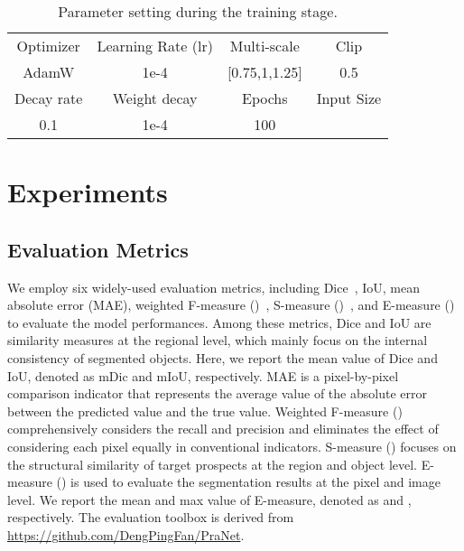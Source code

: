 \documentclass[journal]{IEEEtran}
\begin{document}
\begin{table}

\small
  \centering
  \caption{Parameter setting during the training stage.}
   \renewcommand{\arraystretch}{1.0}
   {
	\setlength\tabcolsep{6.0pt}
    \begin{tabular}{cccc}
    \hline
    Optimizer & Learning Rate (lr) & Multi-scale & Clip\\
AdamW & 1e-4 & [0.75,1,1.25] & 0.5\\
    \hline
     Decay rate & Weight decay & Epochs & Input Size \\
0.1 & 1e-4 & 100   &  \\
    \hline
    \end{tabular}\label{tab:train parameters}}\vspace{8pt}
\end{table}

\section{Experiments}\label{sec:Experiments}
\subsection{Evaluation Metrics} \label{sec:Metrics}
We employ six widely-used evaluation metrics, including Dice~\cite{milletari2016v}, IoU, mean absolute error (MAE), weighted F-measure (){~\cite{margolin2014evaluate}}, S-measure ()~\cite{Fan2021S-measure}, and E-measure ()~\cite{21Fan_HybridLoss,Fan2018Emeasure}  to evaluate the model performances.
Among these metrics, Dice and IoU are similarity measures at the regional level, which mainly focus on the internal consistency of segmented objects. 
Here, we report the mean value of Dice and IoU, denoted as mDic and mIoU, respectively. 
MAE is a pixel-by-pixel comparison indicator that represents the average value of the absolute error between the predicted value and the true value. 
Weighted F-measure () comprehensively considers the recall and precision and eliminates the effect of considering each pixel equally in conventional indicators.
S-measure () focuses on the structural similarity of target prospects at the region and object level.
E-measure () is used to evaluate the segmentation results at the pixel and image level.
We report the mean and max value of E-measure, denoted as  and , respectively.
The evaluation toolbox is derived from 
\url{https://github.com/DengPingFan/PraNet}.
\end{document}
